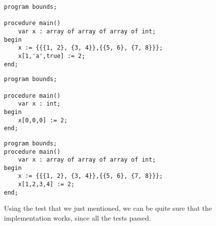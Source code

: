 \begin{lstlisting}[style=paladim, caption=testWrongIndexType.pal tests invalid types in indexing]
program bounds;

procedure main()
    var x : array of array of array of int;
begin
    x := {{{1, 2}, {3, 4}},{{5, 6}, {7, 8}}};
    x[1,'a',true] := 2;
end;
\end{lstlisting}

\begin{lstlisting}[style=paladim, caption=testZeroRank.pal tests zero rank]
program bounds;

procedure main()
    var x : int;
begin
    x[0,0,0] := 2;
end;
\end{lstlisting}

\begin{lstlisting}[style=paladim, caption=testWrongRank.pal tests wrong rank]
program bounds;
procedure main()
    var x : array of array of array of int;
begin
    x := {{{1, 2}, {3, 4}},{{5, 6}, {7, 8}}};
    x[1,2,3,4] := 2;
end;
\end{lstlisting}
Using the test that we just mentioned, we can be quite sure that the implementation works, since all the tests passed.

